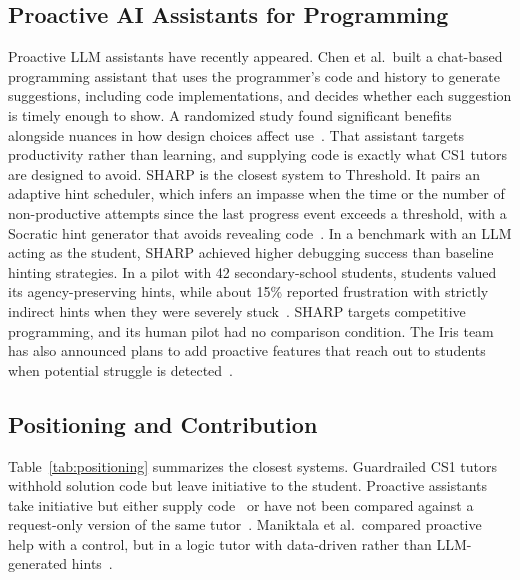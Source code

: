 \documentclass[manuscript,review]{acmart}
\begin{document}
\subsection{Proactive AI Assistants for Programming}
Proactive LLM assistants have recently appeared. Chen et al.\ built a chat-based programming assistant that uses the programmer's code and history to generate suggestions, including code implementations, and decides whether each suggestion is timely enough to show. A randomized study found significant benefits alongside nuances in how design choices affect use~\cite{chen2025needhelp}. That assistant targets productivity rather than learning, and supplying code is exactly what CS1 tutors are designed to avoid. SHARP is the closest system to Threshold. It pairs an adaptive hint scheduler, which infers an impasse when the time or the number of non-productive attempts since the last progress event exceeds a threshold, with a Socratic hint generator that avoids revealing code~\cite{wang2026sharp}. In a benchmark with an LLM acting as the student, SHARP achieved higher debugging success than baseline hinting strategies. In a pilot with 42 secondary-school students, students valued its agency-preserving hints, while about 15\% reported frustration with strictly indirect hints when they were severely stuck~\cite{wang2026sharp}. SHARP targets competitive programming, and its human pilot had no comparison condition. The Iris team has also announced plans to add proactive features that reach out to students when potential struggle is detected~\cite{tum2026iris}.

\subsection{Positioning and Contribution}
Table~\ref{tab:positioning} summarizes the closest systems. Guardrailed CS1 tutors withhold solution code but leave initiative to the student. Proactive assistants take initiative but either supply code~\cite{chen2025needhelp} or have not been compared against a request-only version of the same tutor~\cite{wang2026sharp}. Maniktala et al.\ compared proactive help with a control, but in a logic tutor with data-driven rather than LLM-generated hints~\cite{maniktala2020helpneed}.
\end{document}
